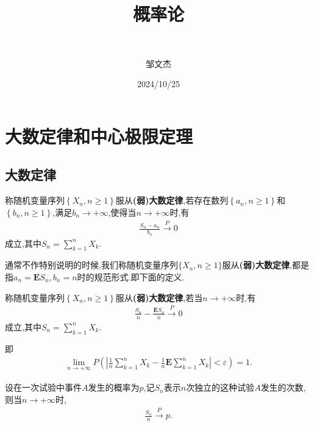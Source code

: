 \documentclass[lang=cn,newtx,10pt,scheme=chinese]{../../Template/elegantbook}
\title{概率论}
\subtitle{\,\,}
\author{邹文杰}
\institute{无}
\date{2024/10/25}
\begin{document}
\maketitle
\frontmatter

\tableofcontents

\mainmatter%

\chapter{大数定律和中心极限定理}

\section{大数定律}

\begin{definition}[(弱)大数定律]\label{definition:(弱)大数定律}
    称随机变量序列$\left\{ X_n,n\ge 1 \right\} $服从\textbf{(弱)大数定律},若存在数列$\left\{a_n,n\geq 1\right\}$和$\left\{b_n,n\geq 1\right\}$,满足$b_n \to +\infty$,使得当$n\to +\infty$时,有
    \begin{align*}
        \frac{S_n-a_n}{b_n}\overset{P}{\rightarrow}0
    \end{align*}
    成立,其中$S_n=\sum\limits_{k=1}^n{X_k}$.
\end{definition}
\begin{note}
    通常不作特别说明的时候,我们称随机变量序列$\{X_n,n\geq 1\}$服从\textbf{(弱)大数定律},都是指$a_n=\boldsymbol{E}S_n,b_n=n$时的规范形式.即下面的定义.
\end{note}

\begin{definition}[(弱)大数定律的规范形式]\label{definition:(弱)大数定律的规范形式}
    称随机变量序列$\left\{ X_n,n\ge 1 \right\}$服从\textbf{(弱)大数定律},若当$n\to +\infty$时,有
    \begin{align*}
        \frac{S_n}{n}-\frac{\boldsymbol{E}S_n}{n}\overset{P}{\rightarrow}0
    \end{align*}
    成立,其中$S_n=\sum\limits_{k=1}^n{X_k}$.
    
    即
    \begin{align*}
        \underset{n\rightarrow +\infty}{\lim}P\left( \left| \frac{1}{n}\sum_{k=1}^n{X_k}-\frac{1}{n}\boldsymbol{E}\sum_{k=1}^n{X_k} \right|<\varepsilon \right) =1.
    \end{align*}
\end{definition}

\begin{theorem}[Bernoulli大数定律]\label{theorem:Bernoulli大数定律}
    设在一次试验中事件$A$发生的概率为$p$,记$S_n$表示$n$次独立的这种试验$A$发生的次数,则当$n\to +\infty$时,
    \begin{align*}
        \frac{S_n}{n}\overset{P}{\rightarrow}p.
    \end{align*}
\end{theorem}
\end{document}
